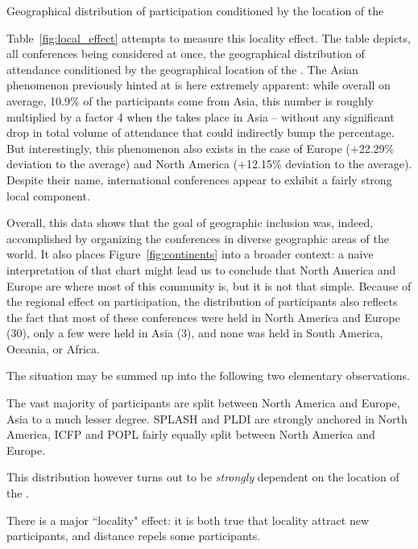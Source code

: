 \begin{table}
\caption{Geographical distribution of participation conditioned by the location of the \event}
\label{fig:local_effect}
\end{table}

Table~\ref{fig:local_effect} attempts to measure this locality effect. The
table depicts, all conferences being considered at once, the geographical
distribution of attendance conditioned by the geographical location of the
\event. The Asian phenomenon previously hinted at is here extremely
apparent: while overall on average, 10.9\% of the participants come from Asia,
this number is roughly multiplied by a factor 4 when the \event takes place in Asia --
without any significant drop in total volume of attendance that could indirectly bump
the percentage.
But interestingly, this phenomenon also exists in the case of Europe (+22.29\%
deviation to the average) and North America (+12.15\% deviation to the average).
Despite their name, international conferences appear to exhibit a fairly strong
local component.

Overall, this data shows that the goal of geographic inclusion was,
indeed, accomplished by organizing the conferences in diverse geographic areas
of the world. It also places Figure~\ref{fig:continents} into a broader context:
a naive interpretation of that chart might lead us to conclude that North
America and Europe are where most of this community is, but it is not that
simple. Because of the regional effect on participation, the distribution of
participants also reflects the fact that most of these conferences were held in
North America and Europe (30), only a few were held in Asia (3), and none was
held in South America, Oceania, or Africa.

The situation may be summed up into the following two elementary observations. 
\begin{obs}
  The vast majority of participants are split between North America and Europe,
  Asia to a much lesser degree. SPLASH and PLDI are strongly anchored in North
  America, ICFP and POPL fairly equally split between North America and Europe.
  \label{obs:dist-naive}
\end{obs}
This distribution however turns out to be \emph{strongly} dependent on the
location of the \event.
\begin{obs}
  There is a major ``locality" effect: it is both true that locality attract
  new participants, and distance repels some participants.
  \label{obs:locality}
\end{obs}


